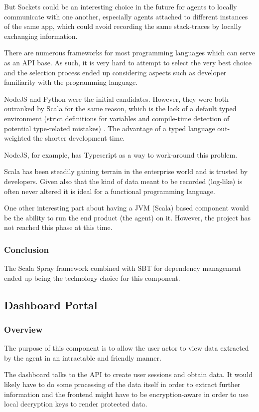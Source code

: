 But Sockets could be an interesting choice in the future for agents to locally communicate with one another, especially agents attached to different instances of the same app, which could avoid recording the same stack-traces by locally exchanging information.

There are numerous frameworks for most programming languages which can serve as an API base. As such, it is very hard to attempt to select the very best choice and the selection process ended up considering aspects such as developer familiarity with the programming language.

NodeJS and Python were the initial candidates. However, they were both outranked by Scala for the same reason, which is the lack of a default typed environment (strict definitions for variables and compile-time detection of potential type-related mistakes) \cite{scalaVSjsRH}. The advantage of a typed language out-weighted the shorter development time.

NodeJS, for example, has Typescript as a way to work-around this problem.

Scala has been steadily gaining terrain in the enterprise world and is trusted by developers. Given also that the kind of data meant to be recorded (log-like) is often never altered it is ideal for a functional programming language.

One other interesting part about having a JVM (Scala) based component would be the ability to run the end product (the agent) on it. However, the project has not reached this phase at this time.

\subsubsection{Conclusion}
The Scala Spray framework combined with SBT for dependency management ended up being the technology choice for this component.

\subsection{Dashboard Portal}
\subsubsection{Overview}
The purpose of this component is to allow the user actor to view data extracted by the agent in an intractable and friendly manner.

The dashboard talks to the API to create user sessions and obtain data. It would likely have to do some processing of the data itself in order to extract further information and the frontend might have to be encryption-aware in order to use local decryption keys to render protected data.

